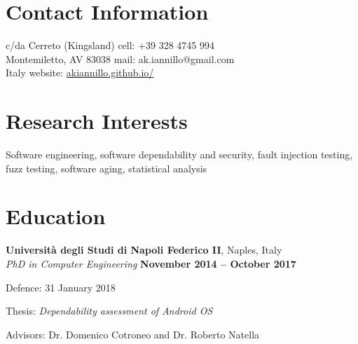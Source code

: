 \documentclass[margin,line]{resume}
\newif\ifReferences
\newif\ifOnline
\begin{document}
\Referencesfalse
\Onlinefalse


\begin{resume}


\section{\mysidestyle Contact Information}
\ifOnline
	mail: ak.iannillo@gmail.com	 							\hfill Montemiletto, AV\\
\else
    c/da Cerreto (Kingsland)			                   			\hfill cell: +39 328 4745 994\\
    Montemiletto, AV 83038								        \hfill mail: ak.iannillo@gmail.com\\
    Italy										\hfill website: \url{akiannillo.github.io/}\\
\fi
   




\section{\mysidestyle Research Interests}
Software engineering, software dependability and security, fault injection testing, fuzz testing, software aging, statistical analysis


\section{\mysidestyle Education}
\textbf{Universit\`a degli Studi di Napoli Federico II}, Naples, Italy \vspace{1mm}\\%
\textsl{PhD in Computer Engineering} \hfill \textbf{November 2014 -- October 2017}\vspace{-3mm}\\\vspace{-1mm}%
\begin{list2}
	\item Defence: 31 January 2018
	\item Thesis: \textsl{Dependability assessment of Android OS}
	\item Advisors: Dr. Domenico Cotroneo and Dr. Roberto Natella
\end{list2}


\end{resume}
\end{document}
